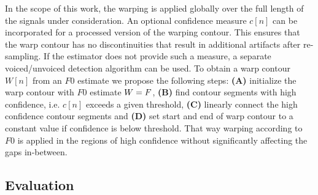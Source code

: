 In the scope of this work, the warping is applied globally over the full length of the signals under consideration. An optional confidence measure $c[n]$ can be incorporated for a processed version of the warping contour. This ensures that the warp contour has no discontinuities that result in additional artifacts after re-sampling. If the estimator does not provide such a measure, a separate voiced/unvoiced detection algorithm can be used. To obtain a warp contour $W[n]$ from an $F0$ estimate we propose the following steps: \textbf{(A)} initialize the warp contour with $F0$ estimate $W = {F}$, \textbf{(B)} find contour segments with high confidence, i.e. $c[n]$ exceeds a given threshold, \textbf{(C)} linearly connect the high confidence contour segments and \textbf{(D)} set start and end of warp contour to a constant value if confidence is below threshold. That way warping according to $F0$ is applied in the regions of high confidence without significantly affecting the gaps in-between.

\subsection{Evaluation}

